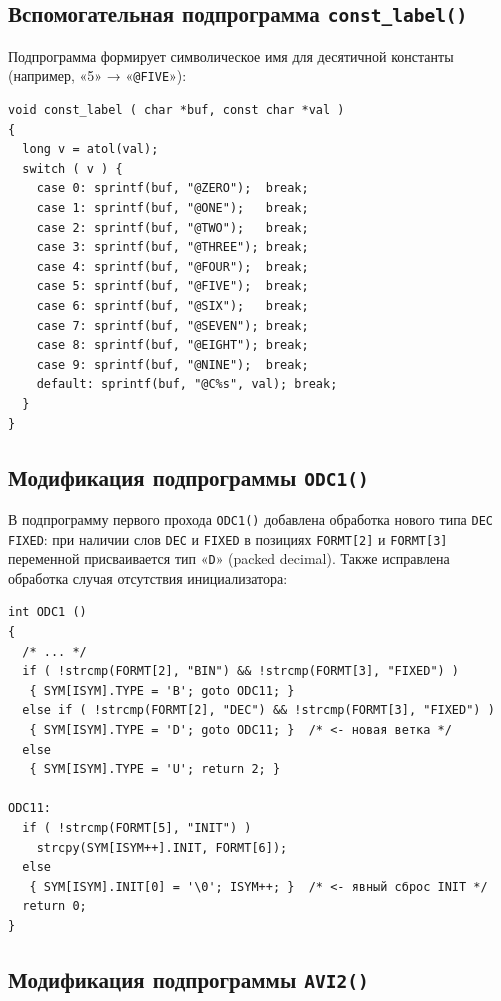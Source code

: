 \documentclass[a4paper,14pt]{extarticle}
\begin{document}
\subsection{Вспомогательная подпрограмма \texttt{const\_label()}}

Подпрограмма формирует символическое имя для десятичной константы
(например, «5» → «\texttt{@FIVE}»):

\begin{lstlisting}[style=Cstyle,caption={Подпрограмма \texttt{const\_label()}},label=lst:constlabel]
void const_label ( char *buf, const char *val )
{
  long v = atol(val);
  switch ( v ) {
    case 0: sprintf(buf, "@ZERO");  break;
    case 1: sprintf(buf, "@ONE");   break;
    case 2: sprintf(buf, "@TWO");   break;
    case 3: sprintf(buf, "@THREE"); break;
    case 4: sprintf(buf, "@FOUR");  break;
    case 5: sprintf(buf, "@FIVE");  break;
    case 6: sprintf(buf, "@SIX");   break;
    case 7: sprintf(buf, "@SEVEN"); break;
    case 8: sprintf(buf, "@EIGHT"); break;
    case 9: sprintf(buf, "@NINE");  break;
    default: sprintf(buf, "@C%s", val); break;
  }
}
\end{lstlisting}

\subsection{Модификация подпрограммы \texttt{ODC1()}}

В подпрограмму первого прохода \texttt{ODC1()} добавлена обработка нового типа
\texttt{DEC FIXED}: при наличии слов \texttt{DEC} и \texttt{FIXED} в позициях
\texttt{FORMT[2]} и \texttt{FORMT[3]} переменной присваивается тип «\texttt{D}»
(packed decimal). Также исправлена обработка случая отсутствия инициализатора:

\begin{lstlisting}[style=Cstyle,caption={Модификация подпрограммы \texttt{ODC1()}},label=lst:odc1]
int ODC1 ()
{
  /* ... */
  if ( !strcmp(FORMT[2], "BIN") && !strcmp(FORMT[3], "FIXED") )
   { SYM[ISYM].TYPE = 'B'; goto ODC11; }
  else if ( !strcmp(FORMT[2], "DEC") && !strcmp(FORMT[3], "FIXED") )
   { SYM[ISYM].TYPE = 'D'; goto ODC11; }  /* <- новая ветка */
  else
   { SYM[ISYM].TYPE = 'U'; return 2; }

ODC11:
  if ( !strcmp(FORMT[5], "INIT") )
    strcpy(SYM[ISYM++].INIT, FORMT[6]);
  else
   { SYM[ISYM].INIT[0] = '\0'; ISYM++; }  /* <- явный сброс INIT */
  return 0;
}
\end{lstlisting}

\subsection{Модификация подпрограммы \texttt{AVI2()}}
\end{document}
